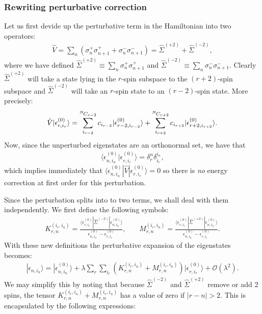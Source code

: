 \documentclass[a4paper]{memoir}
\newcommand{\bra}[1]{\langle#1|}
\newcommand{\ket}[1]{|#1\rangle}
\newcommand{\gap}{\,\,\,\,\,\,\,\,\,\,\,}
\newcommand{\Choose}[2]{{}^{#1}\hspace{-1pt}C_{#2}}
\newcommand{\enn}{\epsilon_{n,i_n}}
\newcommand{\enrnought}{\epsilon_{r,i_r}^{(0)}}
\newcommand{\ennnought}{\epsilon_{n,i_n}^{(0)}}
\newcommand{\sigpp}{\hat{\Sigma}^{(+2)}}
\newcommand{\sigmm}{\hat{\Sigma}^{(-2)}}
\begin{document}
\subsubsection*{Rewriting perturbative correction}
%
Let us first devide up the perturbative term in the Hamiltonian into
two operators:
\begin{align}
  \hat{V} = \sum_n(\sigma^+_n\sigma^+_{n+1}+\sigma^-_n\sigma^-_{n+1})
          = \sigpp+\sigmm,
\end{align}
where we have defined $\sigpp\equiv\sum_n\sigma^+_n\sigma^+_{n+1}$ and
$\sigmm\equiv\sum_n\sigma^-_n\sigma^-_{n+1}$. Clearly $\sigpp$ will
take a state lying in the $r$-spin subspace to the $(r+2)$-spin
subspace and $\sigmm$ will take an $r$-spin state to an $(r-2)$-spin
state. More precisely:
\begin{align}
  \hat{V}\ket{\enrnought}=\sum_{i_{r-2}}^{\Choose{N}{r-2}}c_{i_{r-2}}
  \ket{\epsilon_{r-2,i_{r-2}}^{(0)}}
  +\sum_{i_{r+2}}^{\Choose{N}{r+2}}c_{i_{r+2}}
  \ket{\epsilon_{r+2,i_{r+2}}^{(0)}}.
\end{align}
Now, since the unperturbed eigenstates are an orthonormal set, we have
that
\begin{align}
  \langle\epsilon_{n,i_n}^{(0)}\ket{\enrnought}=\delta^n_r\delta_{i_r}^{i_n},
\end{align}
which implies immediately that
$\bra{\ennnought}\hat{V}\ket{\enrnought}=0$ so there is \textit{no}
energy correction at first order for this perturbation.
%
\par Since the perturbation splits into to two terms, we shall deal
with them independently. We first define the following symbols:
\begin{align}
  K_{r,n}^{(i_r,i_n)}=\frac{\bra{\enrnought}\sigmm\ket{\ennnought}}
                           {\ennnought-\enrnought},\gap
  M_{r,n}^{(i_r,i_n)}=\frac{\bra{\enrnought}\sigpp\ket{\ennnought}}
                           {\ennnought-\enrnought}.
\end{align}
With these new definitions the perturbative expansion of the
eigenstates becomes:
\begin{align}
  \ket{\enn} = \ket{\ennnought}+\lambda\sum_r\sum_{i_r}
  \left(K_{r,n}^{(i_r,i_n)}+M_{r,n}^{(i_r,i_n)}\right)\ket{\enrnought}
  +\mathcal{O}(\lambda^2).
\end{align}
We may simplify this by noting that because $\sigmm$ and $\sigpp$
remove or add 2 spins, the tensor
$K_{r,n}^{(i_r,i_n)}+M_{r,n}^{(i_r,i_n)}$ has a value of zero if
$|r-n|>2$. This is encapsulated by the following expressions:
\end{document}
